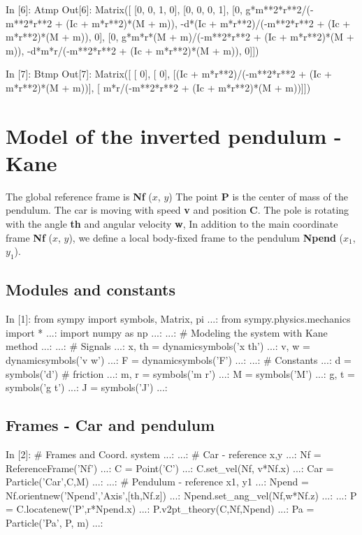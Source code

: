 \begin{code}
In [6]: Atmp
Out[6]: 
Matrix([
[0,                                                  0,                                                     1, 0],
[0,                                                  0,                                                     0, 1],
[0,   g*m**2*r**2/(-m**2*r**2 + (Ic + m*r**2)*(M + m)), -d*(Ic + m*r**2)/(-m**2*r**2 + (Ic + m*r**2)*(M + m)), 0],
[0, g*m*r*(M + m)/(-m**2*r**2 + (Ic + m*r**2)*(M + m)),           -d*m*r/(-m**2*r**2 + (Ic + m*r**2)*(M + m)), 0]])
\end{code}

\begin{code}
In [7]: Btmp
Out[7]: 
Matrix([
[                                                 0],
[                                                 0],
[(Ic + m*r**2)/(-m**2*r**2 + (Ic + m*r**2)*(M + m))],
[          m*r/(-m**2*r**2 + (Ic + m*r**2)*(M + m))]])
\end{code}

\section{Model of the inverted pendulum - Kane}

The global reference frame is \textbf{Nf} ($x$, $y$)
The point \textbf{P} is the center of mass of the pendulum. The car is moving 
with speed \textbf{v} and position \textbf{C}.
The pole is rotating with the angle \textbf{th} and angular velocity 
\textbf{w}, 
In addition to the main coordinate frame \textbf{Nf} ($x$, $y$), we define a 
local body-fixed frame to the pendulum \textbf{Npend} ($x_1$, $y_1$).

\subsection{Modules and constants}
\begin{code}
In [1]: from sympy import symbols, Matrix, pi
   ...: from sympy.physics.mechanics import *
   ...: import numpy as np
   ...: 
   ...: # Modeling the system with Kane method
   ...: 
   ...: # Signals
   ...: x, th  = dynamicsymbols('x th')
   ...: v, w = dynamicsymbols('v w')
   ...: F = dynamicsymbols('F')
  ...: 
   ...: # Constants
   ...: d = symbols('d') # friction
   ...: m, r = symbols('m r')
   ...: M = symbols('M')
   ...: g, t = symbols('g t')
   ...: J = symbols('J')
   ...: 
\end{code}

\subsection{Frames - Car and pendulum}
\begin{code}
In [2]: # Frames and Coord. system
   ...: 
   ...: # Car - reference x,y
   ...: Nf = ReferenceFrame('Nf')
   ...: C = Point('C')                         
   ...: C.set_vel(Nf, v*Nf.x)
   ...: Car = Particle('Car',C,M)
   ...: 
   ...: # Pendulum - reference x1, y1
   ...: Npend = Nf.orientnew('Npend','Axis',[th,Nf.z])
   ...: Npend.set_ang_vel(Nf,w*Nf.z)
   ...: 
   ...: P = C.locatenew('P',r*Npend.x)
   ...: P.v2pt_theory(C,Nf,Npend)
   ...: Pa = Particle('Pa', P, m)
   ...: 
\end{code}

